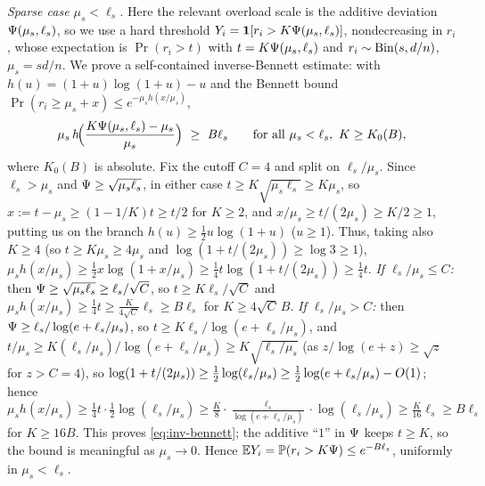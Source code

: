 \emph{Sparse case $\mu_s<\ell_s$.} Here the relevant overload scale is the additive deviation $\Psi(\mu_s,\ell_s)$, so we
use a hard threshold $Y_i=\mathbf{1}[r_i>K\Psi(\mu_s,\ell_s)]$, nondecreasing in $r_i$, whose expectation is
$\Pr(r_i> t)$ with $t=K\Psi(\mu_s,\ell_s)$ and $r_i\sim\mathrm{Bin}(s,d/n)$, $\mu_s=sd/n$. We prove a self-contained inverse-Bennett
estimate: with $h(u)=(1+u)\log(1+u)-u$ and the Bennett bound $\Pr(r_i\ge\mu_s+x)\le e^{-\mu_s h(x/\mu_s)}$,
\begin{equation}\label{eq:inv-bennett}
  \mu_s\,h\!\Big(\frac{K\Psifn(\mu_s,\ell_s)-\mu_s}{\mu_s}\Big)\ \ge\ B\ell_s\qquad\text{for all }\mu_s<\ell_s,\ K\ge K_0(B),
\end{equation}
where $K_0(B)$ is absolute. Fix the cutoff $C=4$ and split on $\ell_s/\mu_s$. Since $\ell_s>\mu_s$ and $\Psi\ge\sqrt{\mu_s\ell_s}$,
in either case $t\ge K\sqrt{\mu_s\ell_s}\ge K\mu_s$, so $x:=t-\mu_s\ge(1-1/K)t\ge t/2$ for $K\ge2$, and $x/\mu_s\ge t/(2\mu_s)\ge K/2\ge1$,
putting us on the branch $h(u)\ge\tfrac12 u\log(1+u)$ ($u\ge1$). Thus, taking also $K\ge4$ (so $t\ge K\mu_s\ge4\mu_s$ and
$\log(1+t/(2\mu_s))\ge\log 3\ge1$),
$\mu_s h(x/\mu_s)\ge\tfrac12 x\log(1+x/\mu_s)\ge\tfrac14 t\log(1+t/(2\mu_s))\ge\tfrac14 t$.
\emph{If $\ell_s/\mu_s\le C$:} then $\Psi\ge\sqrt{\mu_s\ell_s}\ge\ell_s/\sqrt C$, so $t\ge K\ell_s/\sqrt C$ and
$\mu_s h(x/\mu_s)\ge\tfrac14 t\ge\tfrac{K}{4\sqrt C}\ell_s\ge B\ell_s$ for $K\ge 4\sqrt C\,B$.
\emph{If $\ell_s/\mu_s>C$:} then $\Psi\ge\ell_s/\log(e+\ell_s/\mu_s)$, so $t\ge K\ell_s/\log(e+\ell_s/\mu_s)$, and
$t/\mu_s\ge K(\ell_s/\mu_s)/\log(e+\ell_s/\mu_s)\ge K\sqrt{\ell_s/\mu_s}$ (as $z/\log(e+z)\ge\sqrt z$ for $z>C=4$), so
$\log(1+t/(2\mu_s))\ge\tfrac12\log(\ell_s/\mu_s)\ge\tfrac12\log(e+\ell_s/\mu_s)-O(1)$; hence
$\mu_s h(x/\mu_s)\ge\tfrac14 t\cdot\tfrac12\log(\ell_s/\mu_s)\ge\tfrac{K}{8}\cdot\frac{\ell_s}{\log(e+\ell_s/\mu_s)}\cdot\log(\ell_s/\mu_s)\ge\tfrac{K}{16}\ell_s\ge B\ell_s$
for $K\ge16B$. This proves \eqref{eq:inv-bennett}; the additive ``$1$'' in $\Psi$ keeps $t\ge K$, so the bound is
meaningful as $\mu_s\to0$. Hence $\mathbb{E} Y_i=\mathbb{P}(r_i>K\Psi)\le e^{-B\ell_s}$, uniformly in $\mu_s<\ell_s$.


